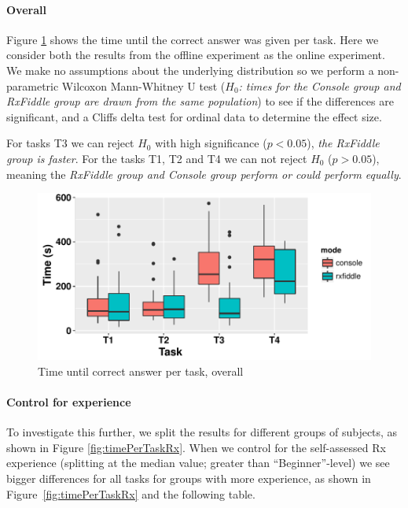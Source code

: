 \paragraph{Overall}
Figure \ref{fig:timePerTask} shows the time until the correct answer was given per task. Here we consider both the results from the offline experiment as the online experiment. We make no assumptions about the underlying distribution so we perform a non-parametric Wilcoxon Mann-Whitney U test (\textit{$H_0$: times for the Console group and RxFiddle group are drawn from the same population}) to see if the differences are significant, and a Cliffs delta test for ordinal data to determine the effect size.

\begin{centering}

\end{centering}

For tasks T3 we can reject $H_0$ with high significance ($p < 0.05$), \emph{the RxFiddle group is faster}.
For the tasks T1, T2 and T4 we can not reject $H_0$ ($p > 0.05$), meaning the \emph{RxFiddle group and Console group perform or could perform equally}.

\begin{figure}[t]
\includegraphics[width=\columnwidth]{images/timePerTask.pdf}
\caption{Time until correct answer per task, overall}
\label{fig:timePerTask}
\end{figure}

\paragraph{Control for experience}
To investigate this further, we split the results for different groups of subjects, as shown in Figure \ref{fig:timePerTaskRx}.  When we control for the self-assessed Rx experience (splitting at the median value; greater than ``Beginner''-level) we see bigger differences for all tasks for groups with more experience, as shown in Figure~\ref{fig:timePerTaskRx} and the following table.

